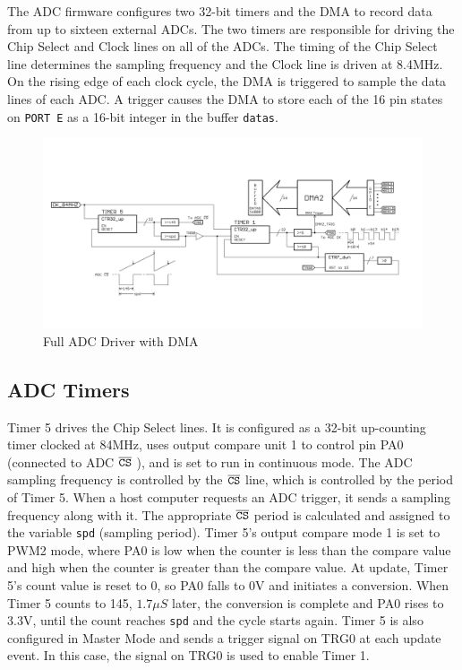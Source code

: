 \documentclass[11pt,twoside]{mitthesis}
\begin{document}
The ADC firmware configures two 32-bit timers and the DMA to record data from up to sixteen external ADCs.
The two timers are responsible for driving the Chip Select and Clock lines on all of the ADCs.
The timing of the Chip Select line determines the sampling frequency and the Clock line is driven at 8.4MHz.
On the rising edge of each clock cycle, the DMA is triggered to sample the data lines of each ADC.
A trigger causes the DMA to store each of the 16 pin states on \texttt{PORT E} as a 16-bit integer in the buffer \texttt{datas}.

\begin{figure}[H]
  \begin{center}
      \includegraphics[width=1\textwidth]{../ADC.png}
      \caption{Full ADC Driver with DMA}
  \end{center}
\end{figure}


\subsection{ADC Timers}

Timer 5 drives the Chip Select lines.
It is configured as a 32-bit up-counting timer clocked at 84MHz, uses output compare unit 1 to control pin PA0 (connected to ADC $\overline{\mbox{\texttt{CS}}}$ ), and is set to run in continuous mode.
The ADC sampling frequency is controlled by the $\overline{\mbox{\texttt{CS}}}$ line, which is controlled by the period of Timer 5.
When a host computer requests an ADC trigger, it sends a sampling frequency along with it.
The appropriate $\overline{\mbox{\texttt{CS}}}$ period is calculated and assigned to the variable \texttt{spd} (sampling period).
Timer 5's output compare mode 1 is set to PWM2 mode, where PA0 is low when the counter is less than the compare value and high when the counter is greater than the compare value.
At update, Timer 5's count value is reset to 0, so PA0 falls to 0V and initiates a conversion.
When Timer 5 counts to 145, $1.7\mu S$ later, the conversion is complete and PA0 rises to 3.3V, until the count reaches \texttt{spd} and the cycle starts again.
Timer 5 is also configured in Master Mode and sends a trigger signal on TRG0 at each update event.
In this case, the signal on TRG0 is used to enable Timer 1.
\end{document}
